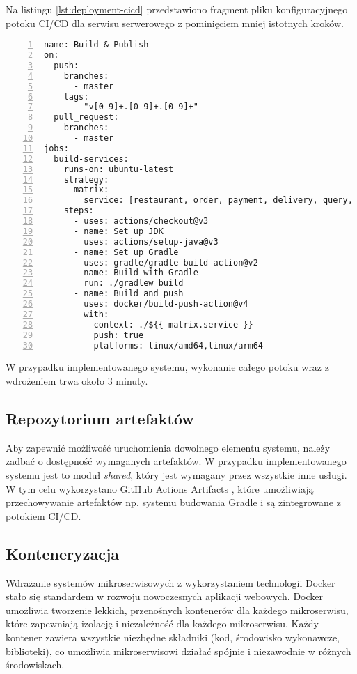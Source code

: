 Na listingu \ref{lst:deployment-cicd} przedstawiono fragment pliku konfiguracyjnego potoku CI/CD dla serwisu serwerowego z pominięciem mniej istotnych kroków.

\begin{lstlisting}[caption={Fragment potoku CI/CD},label={lst:deployment-cicd},captionpos=b,numbers=left]
name: Build & Publish
on:
  push:
    branches:
      - master
    tags:
      - "v[0-9]+.[0-9]+.[0-9]+"
  pull_request:
    branches:
      - master
jobs:
  build-services:
    runs-on: ubuntu-latest
    strategy:
      matrix:
        service: [restaurant, order, payment, delivery, query, saga]
    steps:
      - uses: actions/checkout@v3
      - name: Set up JDK
        uses: actions/setup-java@v3
      - name: Set up Gradle
        uses: gradle/gradle-build-action@v2
      - name: Build with Gradle
        run: ./gradlew build
      - name: Build and push
        uses: docker/build-push-action@v4
        with:
          context: ./${{ matrix.service }}
          push: true
          platforms: linux/amd64,linux/arm64
\end{lstlisting}

W przypadku implementowanego systemu, wykonanie całego potoku wraz z wdrożeniem trwa około 3 minuty.

\subsection{Repozytorium artefaktów}

Aby zapewnić możliwość uruchomienia dowolnego elementu systemu, należy zadbać o dostępność wymaganych artefaktów. W przypadku implementowanego systemu jest to moduł \textit{shared}, który jest wymagany przez wszystkie inne usługi. W tym celu wykorzystano GitHub Actions Artifacts \cite{gaa}, które umożliwiają przechowywanie artefaktów np. systemu budowania Gradle i są zintegrowane z potokiem CI/CD.

\subsection{Konteneryzacja}

Wdrażanie systemów mikroserwisowych z wykorzystaniem technologii Docker stało się standardem w rozwoju nowoczesnych aplikacji webowych. Docker umożliwia tworzenie lekkich, przenośnych kontenerów dla każdego mikroserwisu, które zapewniają izolację i niezależność dla każdego mikroserwisu. Każdy kontener zawiera wszystkie niezbędne składniki (kod, środowisko wykonawcze, biblioteki), co umożliwia mikroserwisowi działać spójnie i niezawodnie w różnych środowiskach. 

